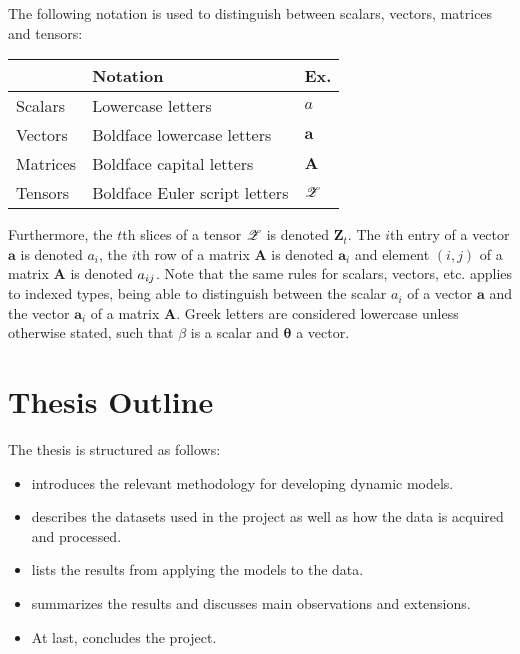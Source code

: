     The following notation is used to distinguish between scalars, vectors, matrices and tensors:
    
    \begin{center}
        \begin{tabular}{l|l|l}
                     & Notation & Ex. \\ \hline
            Scalars  & Lowercase letters & $a$ \\
            Vectors  & Boldface lowercase letters & $\bm{a}$ \\
            Matrices & Boldface capital letters & $\bm{A}$ \\
            Tensors  & Boldface Euler script letters & $\bm{\mathscr{Z}}$ \\
        \end{tabular}
    \end{center}
    
    Furthermore, the $t$th slices of a tensor $\bm{\mathscr{Z}}$ is denoted $\bm{Z}_t$. The $i$th entry of a vector $\bm{a}$ is denoted $a_i$, the $i$th row of a matrix $\bm{A}$ is denoted $\bm{a}_i$ and element $(i,j)$ of a matrix $\bm{A}$ is denoted $\sub(a)$. Note that the same rules for scalars, vectors, etc. applies to indexed types, being able to distinguish between the scalar $a_i$ of a vector $\bm{a}$ and the vector $\bm{a}_i$ of a matrix $\bm{A}$. Greek letters are considered lowercase unless otherwise stated, such that $\beta$ is a scalar and $\bm{\theta}$ a vector.
    
\section{Thesis Outline}

    The thesis is structured as follows:
    \begin{itemize}
        \item {} introduces the relevant methodology for developing dynamic models.
        \item {} describes the datasets used in the project as well as how the data is acquired and processed.
        \item {} lists the results from applying the models to the data.
        \item {} summarizes the results and discusses main observations and extensions.
        \item At last,  concludes the project.
    \end{itemize}